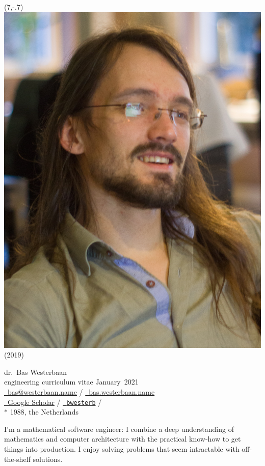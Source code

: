 \documentclass[a4page]{article}
\newcommand\hsep{ {\color{gray}/} }
\begin{document}
\begin{textblock}{2}(7,-.7)
    \noindent
\includegraphics[width=\textwidth]{me}
        \footnotesize(2019)
\end{textblock}\noindent
\textsf{\Large dr.~Bas Westerbaan}\\
engineering curriculum vitae January~2021\\

\noindent
\href{mailto:bas@westerbaan.name}{\faEnvelopeO\ bas@westerbaan.name} \hsep
\href{https://bas.westerbaan.name}{\faExternalLink\ bas.westerbaan.name}\\
\href{https://scholar.google.nl/citations?user=AN7BEa8AAAAJ}{%
    \faGraduationCap\ Google Scholar}
    \hsep \href{https://github.com/bwesterb}{\faGithub\ \texttt{bwesterb}}
    \hsep \href{https://www.linkedin.com/in/baswesterbaan/}{\faLinkedinSquare} \\
$*$ 1988, the Netherlands

\vskip0.3cm\noindent
I'm a mathematical software engineer: I combine a deep understanding
    of mathematics and computer architecture
    with the practical know-how to get things into production.
    I enjoy solving  problems that seem intractable
        with off-the-shelf solutions.
\end{document}
